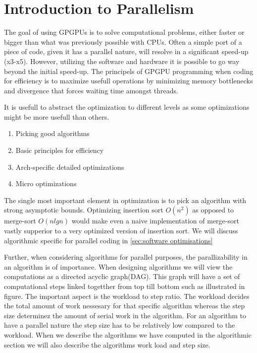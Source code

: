 \section{Introduction to Parallelism}
\label{sec:introduction to parallelism}
The goal of using GPGPUs is to solve computational problems, either faster or bigger than what was previously possible with CPUs.
Often a simple port of a piece of code, given it has a parallel nature, will resolve in a significant speed-up (x3-x5).
However, utilizing the software and hardware it is possible to go way beyond the initial speed-up.
The principels of GPGPU programming when coding for efficiency is to maximize usefull operations by minimizing memory bottlenecks and divergence that forces waiting time amongst threads.

It is usefull to abstract the optimization to different levels as some optimizations might be more usefull than others.

\begin{enumerate}
\item Picking good algorithms
\item Basic principles for efficiency
\item Arch-specific detailed optimizations
\item Micro optimizations
\end{enumerate}

The single most important element in optimization is to pick an algorithm with strong asymptotic bounds.
Optimizing insertion sort $O(n^2)$ as opposed to merge-sort $O(nlgn)$ would make even a naive implementation of merge-sort vastly supperior to a very optimized version of insertion sort.
We will discuss algorithmic specific for parallel coding in \cref{sec:software optimisations}

Further, when considering algorithms for parallel purposes, the parallizability in an algorithm is of importance.
When designing algorithms we will view the computations as a directed acyclic graph(DAG).
This graph will have a set of computational steps linked togetther from top till bottom such as illustrated in figure. 
The important aspect is the workload to step ratio. The workload decides the total amount of work nessesary for that specific algorithm whereas the step size determinez the amount of serial work in the algorithm.
For an algorithm to have a parallel nature the step size has to be relatively low compared to the workload.
When we describe the algorithms we have computed in the algorithmic section we will also describe the algorithms work load and step size.

